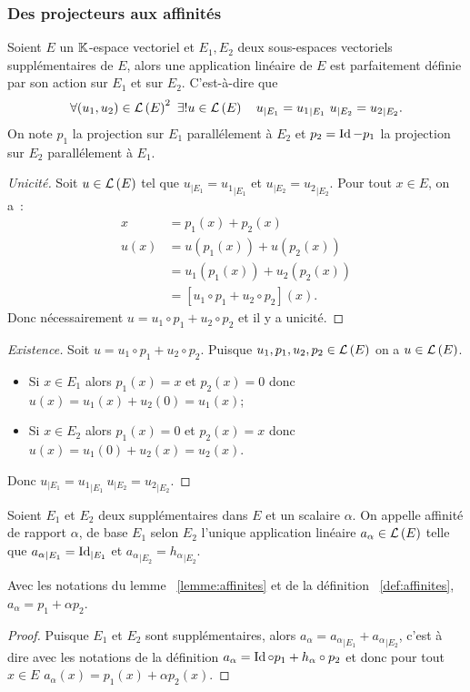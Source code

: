 \subsubsection{Des projecteurs aux affinités}
\begin{lemme}\label{lemme:affinites}
  Soient \(E\) un \(\mathbb{K}\)-espace vectoriel et \(E_1,E_2\) deux sous-espaces vectoriels supplémentaires de \(E\), alors une application linéaire de \(E\) est parfaitement définie par son action sur \(E_1\) et sur \(E_2\). C'est-à-dire que
  \begin{equation}
    \forall (u_1,u_2) \in \Endo{E}^2 \ \exists! u \in \Endo{E} \quad u_{|E_1}={u_1}_{|E_1} \ u_{|E_2}={u_2}_{|E_2}.
  \end{equation}
  On note \(p_1\) la projection sur \(E_1\) parallélement à \(E_2\) et \(p_2=\operatorname{Id}-p_1\) la projection sur \(E_2\) parallélement à \(E_1\).
\end{lemme}
\begin{proof}[Unicité]
  Soit \(u \in \mathcal{L}\left(E\right)\) tel que \(u_{|E_1}={u_1}_{|E_1}\) et  \(u_{|E_2}={u_2}_{|E_2}\). Pour tout \(x \in E\), on a~:
  \begin{align}
    x&=p_1(x)+p_2(x)\\
    u(x)&=u(p_1(x))+u(p_2(x))\\
    &=u_1(p_1(x)) +u_2(p_2(x))\\
    &=[u_1\circ p_1 +u_2 \circ p_2](x).
  \end{align}
  Donc nécessairement \(u=u_1\circ p_1 +u_2 \circ p_2\) et il y a unicité.
\end{proof}
\begin{proof}[Existence]
  Soit \(u=u_1\circ p_1 +u_2 \circ p_2\). Puisque \(u_1,p_1,u_2,p_2 \in \mathcal{L}\left(E\right)\) on a \(u \in \mathcal{L}\left(E\right)\).
  \begin{itemize}
  \item Si \(x \in E_1\) alors \(p_1(x)=x\) et \(p_2(x)=0\) donc \(u(x)=u_1(x)+u_2(0)=u_1(x)\);
  \item Si \(x \in E_2\) alors \(p_1(x)=0\) et \(p_2(x)=x\) donc \(u(x)=u_1(0)+u_2(x)=u_2(x)\).
  \end{itemize}
  Donc \(u_{|E_1}={u_1}_{|E_1} \ u_{|E_2}={u_2}_{|E_2}\).
\end{proof}
%
\begin{defdef}\label{def:affinites}
  Soient \(E_1\) et \(E_2\) deux supplémentaires dans \(E\) et un scalaire \(\alpha\). On appelle affinité de rapport \(\alpha\), de base \(E_1\) selon \(E_2\) l'unique application linéaire \(a_\alpha \in \mathcal{L}\left(E\right)\) telle que \({a_\alpha}_{|E_1} = \operatorname{Id}_{|E_1}\) et \({a_\alpha}_{|E_2} = {h_\alpha}_{|E_2}\).
\end{defdef}
%
\begin{prop}
  Avec les notations du lemme~
\ref{lemme:affinites} et de la définition~
\ref{def:affinites}, \(a_{\alpha}=p_1+\alpha p_2\).
\end{prop}
\begin{proof}
  Puisque \(E_1\) et \(E_2\) sont supplémentaires, alors \(a_\alpha= {a_\alpha}_{|E_1} + {a_\alpha}_{|E_2}\), c'est à dire avec les notations de la définition \(a_\alpha= \operatorname{Id} \circ p_1 + h_\alpha \circ p_2\) et donc pour tout \(x \in E\) \(a_\alpha(x)=p_1(x)+\alpha p_2(x)\).
\end{proof}

